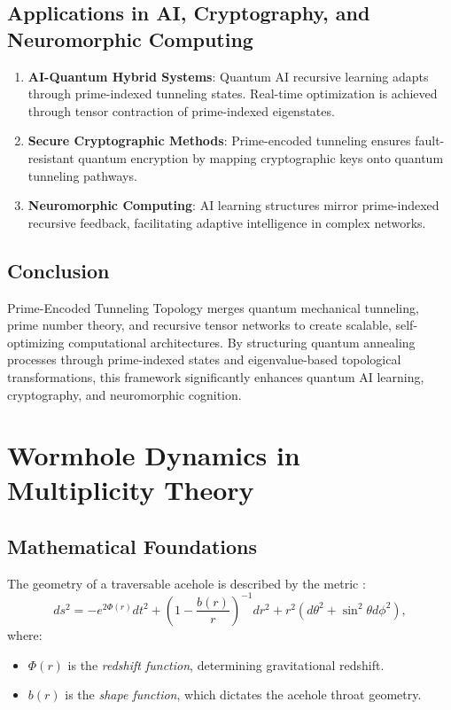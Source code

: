 \documentclass{article}
\theoremstyle{plain}
\begin{document}
\begin{itemize}
\begin{itemize}
\subsection{Applications in AI, Cryptography, and Neuromorphic Computing}
\begin{enumerate}
    \item \textbf{AI-Quantum Hybrid Systems}: Quantum AI recursive learning adapts through prime-indexed tunneling states. Real-time optimization is achieved through tensor contraction of prime-indexed eigenstates.
    \item \textbf{Secure Cryptographic Methods}: Prime-encoded tunneling ensures fault-resistant quantum encryption by mapping cryptographic keys onto quantum tunneling pathways.
    \item \textbf{Neuromorphic Computing}: AI learning structures mirror prime-indexed recursive feedback, facilitating adaptive intelligence in complex networks.
\end{enumerate}

\subsection{Conclusion}
Prime-Encoded Tunneling Topology merges quantum mechanical tunneling, prime number theory, and recursive tensor networks to create scalable, self-optimizing computational architectures. By structuring quantum annealing processes through prime-indexed states and eigenvalue-based topological transformations, this framework significantly enhances quantum AI learning, cryptography, and neuromorphic cognition.


\section{Wormhole Dynamics in Multiplicity Theory}

\subsection{Mathematical Foundations}

The geometry of a traversable acehole is described by the metric \cite{morris1988aceholes}:
\begin{equation}
ds^2 = -e^{2\Phi(r)} dt^2 + \left(1 - \frac{b(r)}{r} \right)^{-1} dr^2 + r^2(d\theta^2 + \sin^2\theta d\phi^2),
\end{equation}
where:
\begin{itemize}
    \item $\Phi(r)$ is the \textit{redshift function}, determining gravitational redshift.
    \item $b(r)$ is the \textit{shape function}, which dictates the acehole throat geometry.
\end{itemize}


\end{itemize}
\end{itemize}
\end{document}
